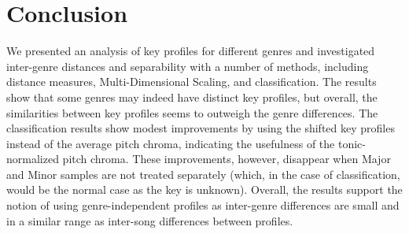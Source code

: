 \documentclass{article}
\begin{document}
\section{Conclusion}
We presented an analysis of key profiles for different genres and investigated inter-genre distances and separability with a number of methods, including distance measures, Multi-Dimensional Scaling, and classification. The results show that some genres may indeed have distinct key profiles, but overall, the similarities between key profiles seems to outweigh the genre differences. The classification results show modest improvements by using the shifted key profiles instead of the average pitch chroma, indicating the usefulness of the tonic-normalized pitch chroma. These improvements, however, disappear when Major and Minor samples are not treated separately (which, in the case of classification, would be the normal case as the key is unknown). %
%
Overall, the results support the notion of using genre-independent profiles as inter-genre differences are small and in a similar range as inter-song differences between profiles. 

\end{document}
